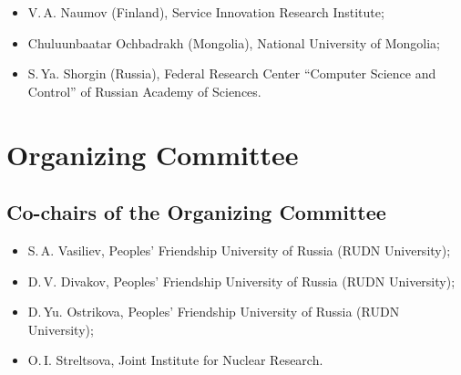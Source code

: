 \begin{itemize}
\item V.\,A. Naumov (Finland), Service Innovation Research Institute;
\item Chuluunbaatar Ochbadrakh (Mongolia), National University of
Mongolia;
\item S.\,Ya. Shorgin (Russia), Federal Research Center ``Computer Science and Control'' of
  Russian Academy of Sciences.
\end{itemize}

\section*{Organizing Committee}

\subsection*{Co-chairs of the Organizing Committee}

\begin{itemize}
\item S.\,A. Vasiliev, Peoples’ Friendship University of Russia (RUDN University);
\item D.\,V. Divakov, Peoples’ Friendship University of Russia (RUDN University);
\item D.\,Yu. Ostrikova, Peoples’ Friendship University of Russia (RUDN University);
\item O.\,I. Streltsova, Joint Institute for Nuclear Research.
\end{itemize}

